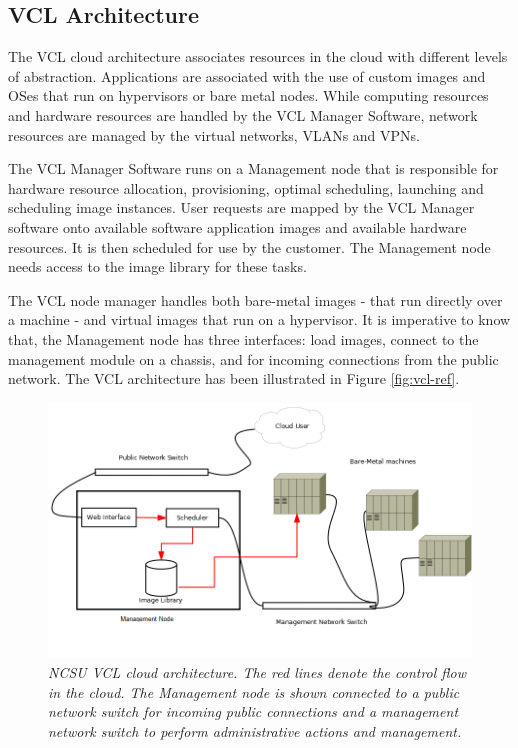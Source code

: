 \documentclass[10pt,twocolumn,pdftex]{article}
\begin{document}
\subsection{VCL Architecture}
The VCL cloud architecture \cite{vcl} associates resources in the cloud with different levels of abstraction. Applications are associated with the use of custom images and OSes that run on hypervisors or bare metal nodes. While computing resources and hardware resources are handled by the VCL Manager Software, network resources are managed by the virtual networks, VLANs and VPNs.

The VCL Manager Software runs on a Management node that is responsible for hardware resource allocation, provisioning, optimal scheduling, launching and scheduling image instances. User requests are mapped by the VCL Manager software onto available software application images and available hardware resources. It is then scheduled for use by the customer. The Management node needs access to the image library for these tasks.

The VCL node manager handles both bare-metal images - that run directly over a machine - and virtual images that run on a hypervisor. It is imperative to know that, the Management node has three interfaces: load images, connect to the management module on a chassis, and for incoming connections from the public network. The VCL architecture has been illustrated in Figure \ref{fig:vcl-ref}.\\

\begin{figure}[htp]
\centering
\includegraphics[scale=0.50]{csc574-vcl-architecture.png}
\caption{\small \sl NCSU VCL cloud architecture. The red lines denote the control flow in the cloud. The Management node is shown connected to a public network switch for incoming public connections and a management network switch to perform administrative actions and management. }
\label{fig:vcl-arch}
\end{figure}	
\end{document}
